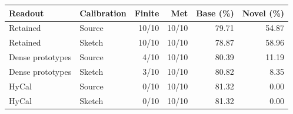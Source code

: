 \begin{tabular}{@{}llrrrr@{}}
\toprule
Readout & Calibration & Finite & Met & Base (\%) & Novel (\%) \\
\midrule
Retained & Source & 10/10 & 10/10 & 79.71 & 54.87 \\
Retained & Sketch & 10/10 & 10/10 & 78.87 & 58.96 \\
\midrule
Dense prototypes & Source & 4/10 & 10/10 & 80.39 & 11.19 \\
Dense prototypes & Sketch & 3/10 & 10/10 & 80.82 & 8.35 \\
\midrule
HyCal & Source & 0/10 & 10/10 & 81.32 & 0.00 \\
HyCal & Sketch & 0/10 & 10/10 & 81.32 & 0.00 \\
\bottomrule
\end{tabular}
